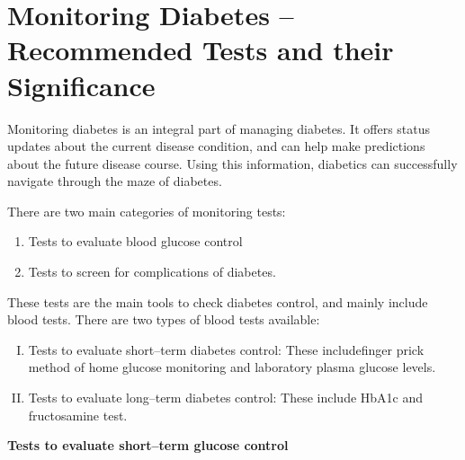 \newpage

\chapter{Monitoring Diabetes – Recommended Tests and their Significance}\label{chap24}

Monitoring diabetes is an integral part of managing diabetes. It offers status updates about the current disease condition, and can help make predictions about the future disease course. Using this information, diabetics can successfully navigate through the maze of diabetes.

\noindent There are two main categories of monitoring tests:

\vspace{-\topsep}
\begin{enumerate}
\itemsep=0pt
\item Tests to evaluate blood glucose control
\item Tests to screen for complications of diabetes.
\end{enumerate}
\vspace{-\topsep}


These tests are the main tools to check diabetes control, and mainly include blood tests. There are two types of blood tests available:

\vspace{-\topsep}
\begin{enumerate}[I.]
\itemsep=0pt
\item Tests to evaluate short–term diabetes control: These include\break finger prick method of home glucose monitoring and laboratory plasma glucose levels.
\item Tests to evaluate long–term diabetes control: These include HbA1c and fructosamine test.
\end{enumerate}
\vspace{-\topsep}

\noindent\textbf{Tests to evaluate short–term glucose control}

